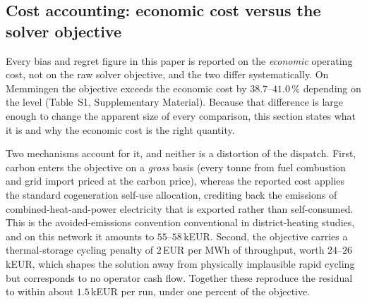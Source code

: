 
\subsection{Cost accounting: economic cost versus the solver objective}
\label{subsec:costacct}

Every bias and regret figure in this paper is reported on the \emph{economic} operating
cost, not on the raw solver objective, and the two differ systematically. On Memmingen the
objective exceeds the economic cost by $38.7$--$41.0$\,\% depending on the level
(Table~S1, Supplementary Material). Because that difference is large enough to change the
apparent size of every comparison, this section states what it is and why the economic cost is the
right quantity.

Two mechanisms account for it, and neither is a distortion of the dispatch. First, carbon
enters the objective on a \emph{gross} basis (every tonne from fuel combustion and grid
import priced at the carbon price), whereas the reported cost applies the standard
cogeneration self-use allocation, crediting back the emissions of combined-heat-and-power
electricity that is exported rather than self-consumed. This is the avoided-emissions
convention conventional in district-heating studies, and on this network it amounts to
$55$--$58$\,kEUR. Second, the objective carries a thermal-storage cycling penalty of
$2$\,EUR per MWh of throughput, worth $24$--$26$\,kEUR, which shapes the solution away from
physically implausible rapid cycling but corresponds to no operator cash flow. Together
these reproduce the residual to within about $1.5$\,kEUR per run, under one percent of the
objective.

